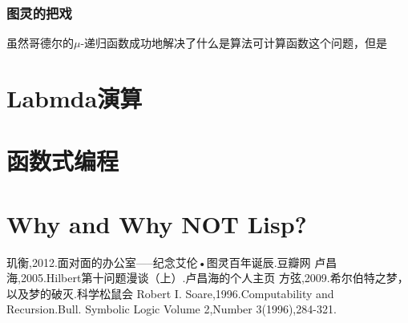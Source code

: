 \documentclass[12pt,a4paper]{ctexrep}
\theoremstyle{definition}
\begin{document}
\subsection{图灵的把戏}

虽然哥德尔的$\mu$-递归函数成功地解决了什么是算法可计算函数这个问题，但是

\chapter{Labmda演算}
\chapter{函数式编程}

\chapter{Why and Why NOT Lisp?}

\begin{thebibliography}{99}
 玑衡,2012.面对面的办公室-----纪念艾伦•图灵百年诞辰.豆瓣网
 卢昌海,2005.Hilbert第十问题漫谈（上）.卢昌海的个人主页
 方弦,2009.希尔伯特之梦，以及梦的破灭.科学松鼠会
 Robert I. Soare,1996.Computability and Recursion.Bull. Symbolic Logic Volume 2,Number 3(1996),284-321.
\end{thebibliography}
\end{document}
